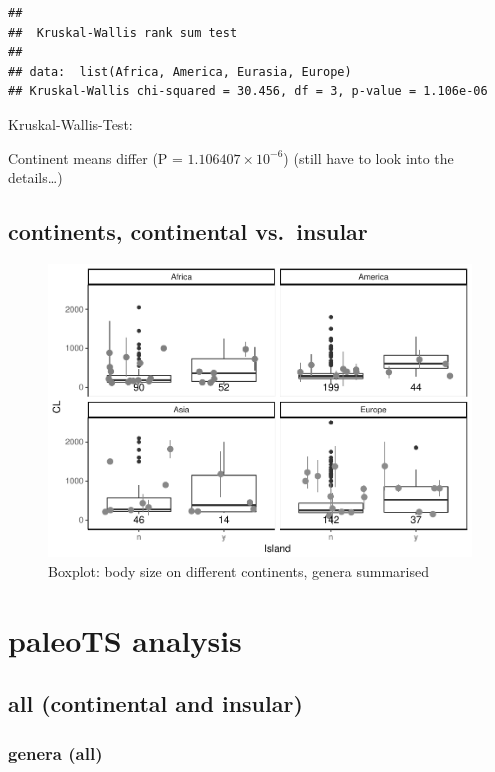 \documentclass[]{article}
\begin{document}
\begin{verbatim}
## 
##  Kruskal-Wallis rank sum test
## 
## data:  list(Africa, America, Eurasia, Europe)
## Kruskal-Wallis chi-squared = 30.456, df = 3, p-value = 1.106e-06
\end{verbatim}

Kruskal-Wallis-Test:

Continent means differ (P = \(1.106407\times 10^{-6}\)) (still have to
look into the details\ldots{})

\newpage

\subsection{continents, continental
vs.~insular}\label{continents-continental-vs.insular}

\begin{figure}[htbp]
\centering
\includegraphics{MA_JJ_files/figure-latex/BPConCI-1.pdf}
\caption{Boxplot: body size on different continents, genera summarised}
\end{figure}

\newpage

\section{paleoTS analysis}\label{paleots-analysis}

\subsection{all (continental and
insular)}\label{all-continental-and-insular}

\subsubsection{genera (all)}\label{genera-all}
\end{document}
